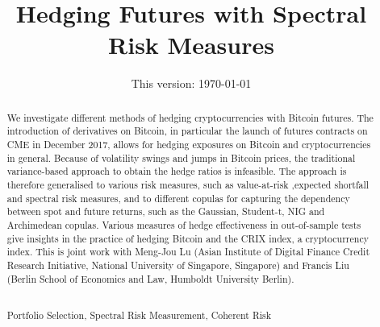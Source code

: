 \documentclass[11pt,a4paper,english]{article}
\title{\LARGE \bf Hedging Futures with Spectral Risk Measures}
\date{This version: \today}
\renewcommand{\baselinestretch}{1.2}
\begin{document}
\newtheorem{lemma}{Lemma}
\newtheorem {proposition}[lemma]{Proposition}
\newtheorem {corollary}{Corollary}
\newtheorem {theorem}{Theorem}
\newtheorem{claim}[lemma]{Claim}
\newtheorem{comment}[lemma]{Comment}
\newtheorem{example}[lemma]{Example}
\newtheorem{fact}[lemma]{Fact}
\newtheorem{defn}[lemma]{Definition}
\newtheorem{exercise}{Exercise}[section]

\newtheorem{programming}[exercise]{Programming assignment}
\newenvironment{proof}{{\flushleft\textbf{\textsl{Proof.\ \ }}}}{\hfill{\hfill\rule{2mm}{2mm}}}
\maketitle
\begin{abstract}
\footnotesize{ We investigate different methods of hedging cryptocurrencies with Bitcoin futures.  The introduction of derivatives on Bitcoin, in particular the launch of futures contracts on CME in December 2017, allows for hedging exposures on Bitcoin and cryptocurrencies in general. Because of volatility swings and jumps in Bitcoin prices, the traditional variance-based approach to obtain the hedge ratios is infeasible.  The approach is therefore generalised  to various risk measures, such as value-at-risk ,expected shortfall and spectral risk measures, and to different copulas for capturing the dependency between spot and future returns, such as the Gaussian, Student-t, NIG and Archimedean copulas. Various measures of hedge effectiveness in out-of-sample tests give insights in the practice of hedging Bitcoin and the CRIX index, a cryptocurrency index. This is joint work with Meng-Jou Lu (Asian Institute of Digital Finance Credit Research Initiative, National University of Singapore, Singapore) and Francis Liu (Berlin School of Economics and Law, Humboldt University Berlin).\\
\renewcommand{\baselinestretch}{1.2}

  \\
 Portfolio Selection, Spectral Risk Measurement,  Coherent Risk}\pagestyle{empty}\\


\end{abstract}


\clearpage
\end{document}
